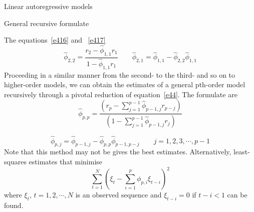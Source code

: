 \documentclass[8pt]{beamer}
\renewcommand{\emph}[1]{\textcolor{myorange}{#1}}
\begin{document}
 \begin{frame}{Linear autoregressive models}
     \begin{block}{General recursive formulate}
    \end{block}
    The equations~\ref{e416} and ~\ref{e417}
    \[ 
    \hat{\phi}_{2,2} = \frac{r_2 - \hat{\phi}_{1,1}r_1}{1-\hat{\phi}_{1,1}r_1} \quad \quad \hat{\phi}_{2,1} = \hat{\phi}_{1,1} - \hat{\phi}_{2,2}\hat{\phi}_{1,1}   
    \]
    Proceeding in a similar manner from the second- to the third- and so on to higher-order models, we can obtain the estimates of a general \emph{pth-order model} recursively through a pivotal  reduction of equation~\ref{e44}. The formulate are 
    \begin{equation}
        \hat{\phi}_{p,p} = \frac{\left( r_p - \sum_{j=1}^{p-1} \hat{\phi}_{p-1,j} r_{p-j} \right)}{\left( 1-\sum_{j=1}^{p-1} \hat{\phi}_{p-1,j} r_{j} \right)}
        \label{e418}
    \end{equation}

    \begin{equation}
        \hat{\phi}_{p,j} =  \hat{\phi}_{p-1,j} - \hat{\phi}_{p,p} \hat{\phi}_{p-1,p-j} \quad \quad j=1,2,3, \cdots, p-1 
        \label{e419}
    \end{equation}
    Note that this method may not be gives the best estimates. Alternatively, \emph{least-squares} estimates that minimise
    \begin{equation}
        \sum_{t=1}^N \left(\xi_t - \sum_{i=1}^p \phi_{p,i} \xi_{t-i} \right)^2
    \end{equation}
    where $\xi_t$, $t=1,2, \cdots, N$ is an observed sequence and $\xi_{t-i} = 0$ if $t-i<1$ can be found. 
\end{frame}

\end{document}
